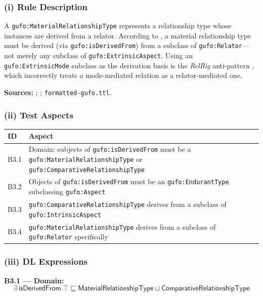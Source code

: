\documentclass[12pt,a4paper]{article}
\newcommand{\gufoclass}[1]{\nolinkurl{gufo:#1}}
\newcommand{\gufoprop}[1]{\nolinkurl{gufo:#1}}
\begin{document}
\subsubsection*{(i) Rule Description}

A \gufoclass{MaterialRelationshipType} represents a relationship type whose
instances are derived from a relator. According to \citet{fonseca2019}, a
material relationship type must be derived (via \gufoprop{isDerivedFrom}) from a
subclass of \gufoclass{Relator}---not merely any subclass of
\gufoclass{ExtrinsicAspect}. Using an \gufoclass{ExtrinsicMode} subclass as the
derivation basis is the \emph{RelRig} anti-pattern \citep{sales2015}, which
incorrectly treats a mode-mediated relation as a relator-mediated one.

\textbf{Sources:} \citet{fonseca2019}; \citet{sales2015}; \texttt{formatted-gufo.ttl}.

\subsubsection*{(ii) Test Aspects}

\begin{tabular}{lL{9.5cm}}
  \toprule
  \textbf{ID} & \textbf{Aspect} \\
  \midrule
  B3.1 & Domain: subjects of \gufoprop{isDerivedFrom} must be a
         \gufoclass{MaterialRelationshipType} or \gufoclass{ComparativeRelationshipType} \\
  B3.2 & Objects of \gufoprop{isDerivedFrom} must be an \gufoclass{EndurantType}
         subclassing \gufoclass{Aspect} \\
  B3.3 & \gufoclass{ComparativeRelationshipType} derives from a subclass of
         \gufoclass{IntrinsicAspect} \\
  B3.4 & \gufoclass{MaterialRelationshipType} derives from a subclass of
         \gufoclass{Relator} specifically \\
  \bottomrule
\end{tabular}

\subsubsection*{(iii) DL Expressions}

\textbf{B3.1 --- Domain:}
\begin{equation*}
  \exists\,\mathsf{isDerivedFrom}.\top
  \sqsubseteq \mathsf{MaterialRelationshipType} \sqcup \mathsf{ComparativeRelationshipType}
\end{equation*}
\end{document}
